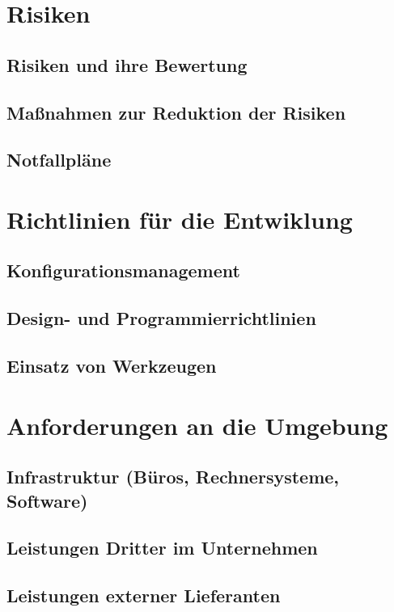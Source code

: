 \documentclass[a4paper,10pt]{scrartcl}
\begin{document}
\section{Risiken}
\subsection{Risiken und ihre Bewertung}
\subsection{Maßnahmen zur Reduktion der Risiken}
\subsection{Notfallpläne}


\section{Richtlinien für die Entwiklung}
\subsection{Konfigurationsmanagement}
\subsection{Design- und Programmierrichtlinien}
\subsection{Einsatz von Werkzeugen}



\section{Anforderungen an die Umgebung}
\subsection{Infrastruktur (Büros, Rechnersysteme, Software)}
\subsection{Leistungen Dritter im Unternehmen}
\subsection{Leistungen externer Lieferanten}
\end{document}
